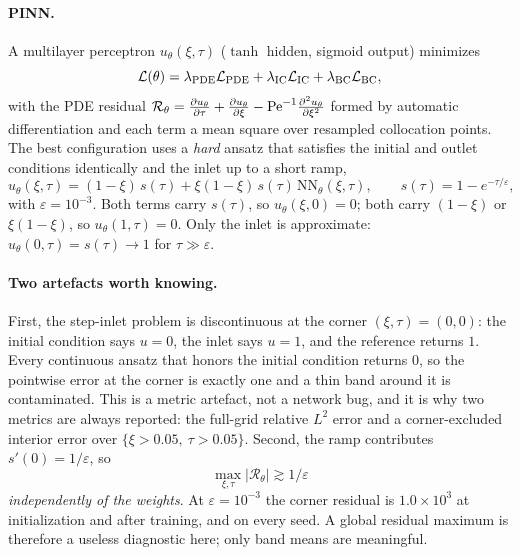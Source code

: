 \paragraph{PINN.} A multilayer perceptron $u_\theta(\xi,\tau)$ ($\tanh$ hidden,
sigmoid output) minimizes
\begin{equation}
\mathcal{L}(\theta)=\lambda_{\mathrm{PDE}}\mathcal{L}_{\mathrm{PDE}}
+\lambda_{\mathrm{IC}}\mathcal{L}_{\mathrm{IC}}+\lambda_{\mathrm{BC}}\mathcal{L}_{\mathrm{BC}},
\label{eq:loss}
\end{equation}
with the PDE residual
$\mathcal{R}_\theta=\frac{\partial u_\theta}{\partial \tau}+\frac{\partial u_\theta}{\partial \xi}
-\mathrm{Pe}^{-1}\frac{\partial^{2} u_\theta}{\partial \xi^{2}}$
formed by automatic differentiation and each term a mean square over resampled
collocation points. The best configuration uses a \emph{hard} ansatz that
satisfies the initial and outlet conditions identically and the inlet up to a
short ramp,
\begin{equation}
u_\theta(\xi,\tau)=(1-\xi)\,s(\tau)
+\xi(1-\xi)\,s(\tau)\,\mathrm{NN}_\theta(\xi,\tau),
\qquad s(\tau)=1-e^{-\tau/\varepsilon},
\label{eq:hardbc}
\end{equation}
with $\varepsilon=10^{-3}$. Both terms carry $s(\tau)$, so $u_\theta(\xi,0)=0$;
both carry $(1-\xi)$ or $\xi(1-\xi)$, so $u_\theta(1,\tau)=0$. Only the inlet is
approximate: $u_\theta(0,\tau)=s(\tau)\to1$ for $\tau\gg\varepsilon$.

\paragraph{Two artefacts worth knowing.} First, the step-inlet problem is
discontinuous at the corner $(\xi,\tau)=(0,0)$: the initial condition says
$u=0$, the inlet says $u=1$, and the reference returns $1$. Every continuous
ansatz that honors the initial condition returns $0$, so the pointwise error at
the corner is exactly one and a thin band around it is contaminated. This is a
metric artefact, not a network bug, and it is why two metrics are always
reported: the full-grid relative $L^2$ error and a corner-excluded interior
error over $\{\xi>0.05,\ \tau>0.05\}$. Second, the ramp contributes
$s'(0)=1/\varepsilon$, so
\begin{equation}
\max_{\xi,\tau}|\mathcal{R}_\theta|\gtrsim 1/\varepsilon
\label{eq:resfloor}
\end{equation}
\emph{independently of the weights}. At $\varepsilon=10^{-3}$ the corner
residual is $1.0\times10^{3}$ at initialization and after training, and on every
seed. A global residual maximum is therefore a useless diagnostic here; only
band means are meaningful.

